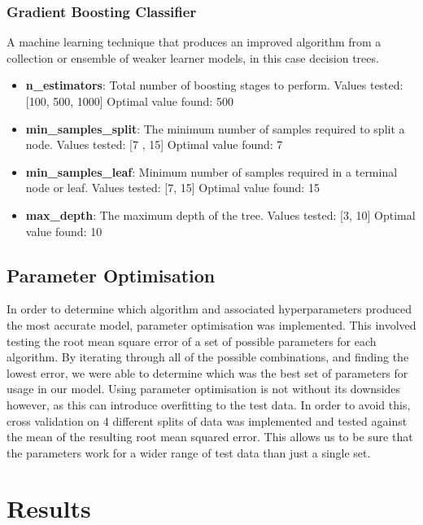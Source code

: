 \documentclass{report}
\begin{document}
	\subsection{Gradient Boosting Classifier}
	A machine learning technique that produces an improved algorithm from a collection or ensemble of weaker learner models, in this case decision trees. 
	\begin{itemize}
		\item \textbf{n\_estimators}: Total number of boosting stages to perform.  
		\subitem Values tested: [100, 500, 1000]
		\subitem Optimal value found: 500
		\item \textbf{min\_samples\_split}: The minimum number of samples required to split a node.
		\subitem Values tested: [7 , 15]
		\subitem Optimal value found: 7
		\item \textbf{min\_samples\_leaf}: Minimum number of samples required in a terminal node or leaf. 
		\subitem Values tested: [7, 15]
		\subitem Optimal value found: 15	
		\item \textbf{max\_depth}: The maximum depth of the tree. 
		\subitem Values tested: [3, 10]	
		\subitem Optimal value found: 10
		
	\end{itemize}
	\section{Parameter Optimisation}
	In order to determine which algorithm and associated hyperparameters produced the most accurate model, parameter optimisation was implemented. This involved testing the root mean square error of a set of possible parameters for each algorithm. By iterating through all of the possible combinations, and finding the lowest error, we were able to determine which was the best set of parameters for usage in our model.	
	Using parameter optimisation is not without its downsides however, as this can introduce overfitting to the test data. In order to avoid this, cross validation on 4 different splits of data was implemented and tested against the mean of the resulting root mean squared error. This allows us to be sure that the parameters work for a wider range of test data than just a single set.
	
	\chapter{Results}
\end{document}

